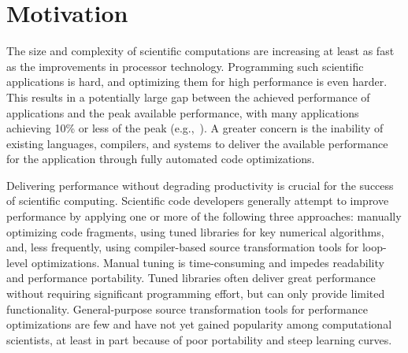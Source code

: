\section{Motivation}
\label{sec:motivation}


The size and complexity of scientific computations are increasing at
least as fast as the improvements in processor technology.
Programming such scientific applications is hard, and optimizing them
for high performance is even harder.  This results in a potentially
large gap between the achieved performance of applications and the
peak available performance, with many applications achieving 10\% or
less of the peak (e.g.,~\cite{Oliker,conf/vecpar/CarterOS06}).  A
greater concern is the inability of existing languages, compilers, and
systems to deliver the available performance for the application
through fully automated code optimizations.

Delivering performance without degrading productivity is crucial for
the success of scientific computing. Scientific code developers
generally attempt to improve performance by applying one or more of
the following three approaches: manually optimizing code fragments,
using tuned libraries for key numerical algorithms, and, less
frequently, using compiler-based source transformation tools for
loop-level optimizations. Manual tuning is time-consuming and impedes
readability and performance portability. Tuned libraries often deliver
great performance without requiring significant programming effort,
but can only provide limited functionality. General-purpose source
transformation tools for performance optimizations are few and have
not yet gained popularity among computational scientists, at least in
part because of poor portability and steep learning curves.
